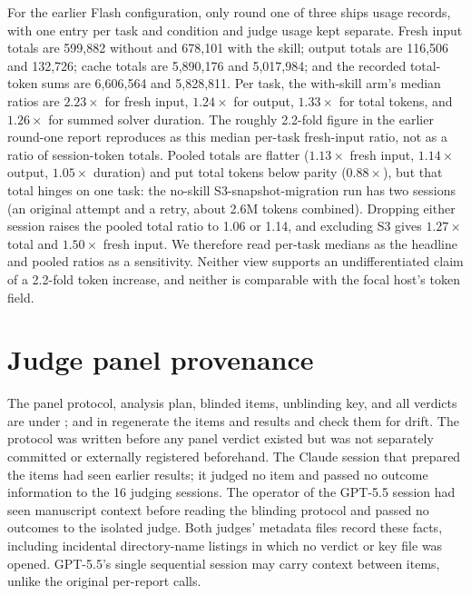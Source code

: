 \documentclass[11pt]{article}
\begin{document}
For the earlier Flash configuration, only round one of three ships usage records, with one entry per task and condition and judge usage kept separate. Fresh input totals are 599,882 without and 678,101 with the skill; output totals are 116,506 and 132,726; cache totals are 5,890,176 and 5,017,984; and the recorded total-token sums are 6,606,564 and 5,828,811. Per task, the with-skill arm's median ratios are $2.23\times$ for fresh input, $1.24\times$ for output, $1.33\times$ for total tokens, and $1.26\times$ for summed solver duration. The roughly 2.2-fold figure in the earlier round-one report reproduces as this median per-task fresh-input ratio, not as a ratio of session-token totals. Pooled totals are flatter ($1.13\times$ fresh input, $1.14\times$ output, $1.05\times$ duration) and put total tokens below parity ($0.88\times$), but that total hinges on one task: the no-skill S3-snapshot-migration run has two sessions (an original attempt and a retry, about 2.6M tokens combined). Dropping either session raises the pooled total ratio to 1.06 or 1.14, and excluding S3 gives $1.27\times$ total and $1.50\times$ fresh input. We therefore read per-task medians as the headline and pooled ratios as a sensitivity. Neither view supports an undifferentiated claim of a 2.2-fold token increase, and neither is comparable with the focal host's token field.

\section{Judge panel provenance}\label{app:panel}
The panel protocol, analysis plan, blinded items, unblinding key, and all verdicts are under ;  and  in  regenerate the items and results and check them for drift. The protocol was written before any panel verdict existed but was not separately committed or externally registered beforehand. The Claude session that prepared the items had seen earlier results; it judged no item and passed no outcome information to the 16 judging sessions. The operator of the GPT-5.5 session had seen manuscript context before reading the blinding protocol and passed no outcomes to the isolated judge. Both judges' metadata files record these facts, including incidental directory-name listings in which no verdict or key file was opened. GPT-5.5's single sequential session may carry context between items, unlike the original per-report calls.
\end{document}
